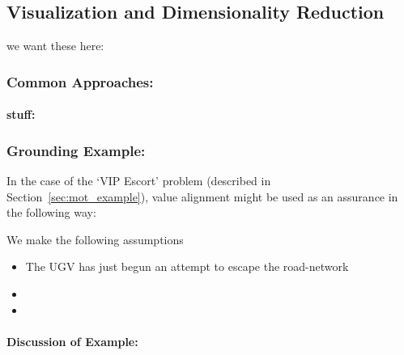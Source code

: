 \subsection{Visualization and Dimensionality Reduction} \label{sec:vis_dr}
we want these here: \citet{Correa2009-hi, Sacha2017-hf, Lyons2017-mh, Chipman2005-om, Venna2007-yj, Vellido2012-nm, Chadalavada2015-wx, Hutchins2015-if}

\subsubsection{Common Approaches:}

\paragraph{stuff:}


\subsubsection{Grounding Example:}
In the case of the `VIP Escort' problem (described in Section~\ref{sec:mot_example}), value alignment might be used as an assurance in the following way:

We make the following assumptions

\begin{itemize}
    \item The UGV has just begun an attempt to escape the road-network
    \item 
    \item 
\end{itemize}

\paragraph{\textbf{Discussion of Example:}} 
